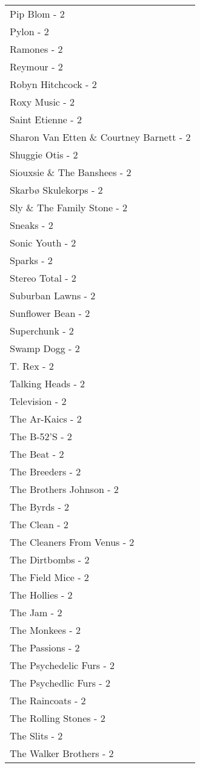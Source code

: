 \documentclass[
]{article}
\begin{document}
\begin{longtable}{l}
Pip Blom - 2 \\ 
Pylon - 2 \\ 
Ramones - 2 \\ 
Reymour - 2 \\ 
Robyn Hitchcock - 2 \\ 
Roxy Music - 2 \\ 
Saint Etienne - 2 \\ 
Sharon Van Etten \& Courtney Barnett - 2 \\ 
Shuggie Otis - 2 \\ 
Siouxsie \& The Banshees - 2 \\ 
Skarbø Skulekorps - 2 \\ 
Sly \& The Family Stone - 2 \\ 
Sneaks - 2 \\ 
Sonic Youth - 2 \\ 
Sparks - 2 \\ 
Stereo Total - 2 \\ 
Suburban Lawns - 2 \\ 
Sunflower Bean - 2 \\ 
Superchunk - 2 \\ 
Swamp Dogg - 2 \\ 
T. Rex - 2 \\ 
Talking Heads - 2 \\ 
Television - 2 \\ 
The Ar-Kaics - 2 \\ 
The B-52'S - 2 \\ 
The Beat - 2 \\ 
The Breeders - 2 \\ 
The Brothers Johnson - 2 \\ 
The Byrds - 2 \\ 
The Clean - 2 \\ 
The Cleaners From Venus - 2 \\ 
The Dirtbombs - 2 \\ 
The Field Mice - 2 \\ 
The Hollies - 2 \\ 
The Jam - 2 \\ 
The Monkees - 2 \\ 
The Passions - 2 \\ 
The Psychedelic Furs - 2 \\ 
The Psychedlic Furs - 2 \\ 
The Raincoats - 2 \\ 
The Rolling Stones - 2 \\ 
The Slits - 2 \\ 
The Walker Brothers - 2 \\ 

\end{longtable}
\end{document}
